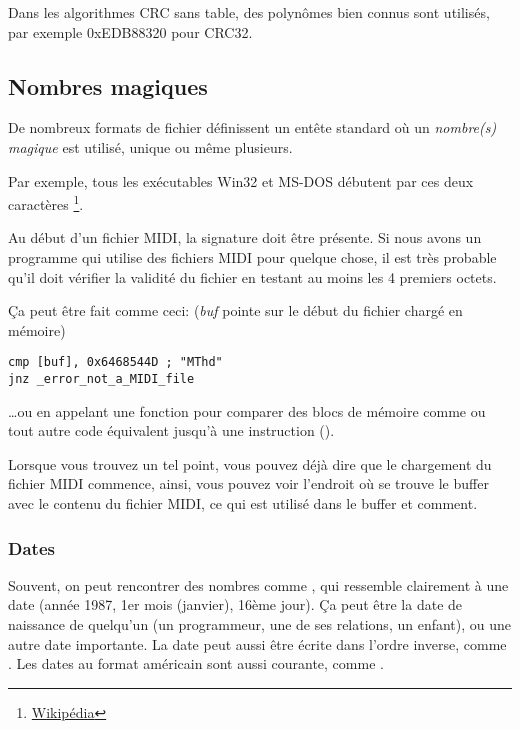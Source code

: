 Dans les algorithmes CRC sans table, des polynômes bien connus sont utilisés, par
exemple 0xEDB88320 pour CRC32.

\subsection{Nombres magiques}
\label{magic_numbers}

De nombreux formats de fichier définissent un entête standard où un \emph{nombre(s) magique}
est utilisé, unique ou même plusieurs.


Par exemple, tous les exécutables Win32 et MS-DOS débutent par ces deux caractères \footnote{\href{http://en.wikipedia.org/wiki/DOS_MZ_executable}{Wikipédia}}.


Au début d'un fichier MIDI, la signature  doit être présente.
Si nous avons un programme qui utilise des fichiers MIDI pour quelque chose, il
est très probable qu'il doit vérifier la validité du fichier en testant au moins
les 4 premiers octets.

Ça peut être fait comme ceci:
(\emph{buf} pointe sur le début du fichier chargé en mémoire)

\begin{lstlisting}[style=customasmx86]
cmp [buf], 0x6468544D ; "MThd"
jnz _error_not_a_MIDI_file
\end{lstlisting}


\dots ou en appelant une fonction pour comparer des blocs de mémoire comme 
ou tout autre code équivalent jusqu'à une instruction  ().

Lorsque vous trouvez un tel point, vous pouvez déjà dire que le chargement du fichier
MIDI commence, ainsi, vous pouvez voir l'endroit où se trouve le buffer avec le contenu
du fichier MIDI, ce qui est utilisé dans le buffer et comment.

\subsubsection{Dates}


Souvent, on peut rencontrer des nombres comme , qui ressemble clairement
à une date (année 1987, 1er mois (janvier), 16ème jour).
Ça peut être la date de naissance de quelqu'un (un programmeur, une de ses relations,
un enfant), ou une autre date importante.
La date peut aussi être écrite dans l'ordre inverse, comme .
Les dates au format américain sont aussi courante, comme .


